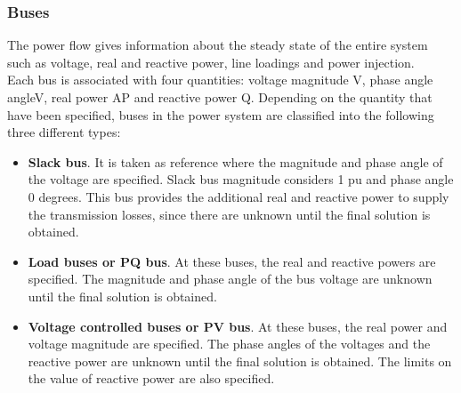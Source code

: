 \subsubsection{Buses}
The power flow gives information about the steady state of the entire system such as voltage, real and reactive power, line loadings and power injection.\\
Each bus is associated with four quantities: voltage magnitude \gls{V}, phase angle \gls{angleV}, real power \gls{AP} and reactive power \gls{Q}.
Depending on the quantity that have been specified, buses in the power system are classified into the following three different types:
\begin{itemize}
    \item \textbf{Slack bus}. It is taken as reference where the magnitude and phase angle of the voltage are specified. Slack bus magnitude considers 1 \gls{pu} and phase angle 0 degrees. This bus provides the additional real and reactive power to supply the transmission losses, since there are unknown until the final solution is obtained.

    \item \textbf{Load buses or PQ bus}. At these buses, the real and reactive powers are specified. The magnitude and phase angle of the bus voltage are unknown until the final solution is obtained.

    \item \textbf{Voltage controlled buses or PV bus}. At these buses, the real power and voltage magnitude are specified. The phase angles of the voltages and the reactive power are unknown until the final solution is obtained. The limits on the value of reactive power are also specified. 
\end{itemize}

